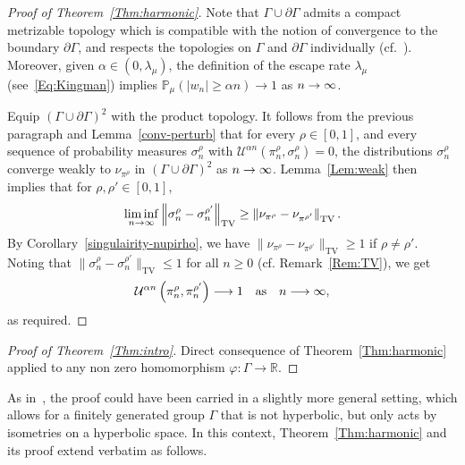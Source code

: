 \documentclass[10pt]{amsart}
\theoremstyle{definition}\newtheorem{defi}[theo]{Definition}\newtheorem{rema}[theo]{Remark}\newtheorem{exam}[theo]{Example}\newtheorem{exem}[theo]{Example}\newtheorem{nota}[theo]{Notation}
\DeclareMathOperator{\TV}{TV}
\newcommand{\cU}{\mathcal{U}}
\newcommand{\R}{\mathbb{R}}
\renewcommand{\Pr}{\mathbb{P}}
\renewcommand{\(}{\left(}
\renewcommand{\)}{\right)}
\renewcommand*{\to}{\mathchoice{\longrightarrow}{\rightarrow}{\rightarrow}{\rightarrow}}
\begin{document}
\begin{proof}[Proof of Theorem~\ref{Thm:harmonic}]
Note that $\Gamma \cup \partial \Gamma$ admits a compact metrizable topology which is compatible with the notion of convergence to the boundary $\partial \Gamma$, and respects the topologies on $\Gamma$ and $\partial \Gamma$ individually (cf.~\cite[7.2.M]{GromovHyperbolic}). Moreover, given $\alpha\in (0, \lambda_{\mu})$, the definition of the escape rate $\lambda_{\mu}$ (see~\eqref{Eq:Kingman}) implies $\Pr_{\mu}(|w_{n}|\geq \alpha n)\rightarrow 1$ as $n \to \infty$.


Equip $(\Gamma \cup \partial \Gamma)^2$ with the product topology. It follows from the previous paragraph and Lemma~\ref{conv-perturb} that for every $\rho \in [0, 1]$, and every sequence of probability measures $\sigma^\rho_{n}$ with $\cU^{\alpha n}(\pi^\rho_n, \sigma^\rho_{n})=0$, the distributions $\sigma^\rho_{n}$ converge weakly to $\nu_{\pi^\rho}$ in $(\Gamma \cup \partial \Gamma)^2$ as $n \to \infty$. Lemma~\ref{Lem:weak} then implies that for $\rho, \rho' \in [0, 1]$,
\[
\liminf_{n \to \infty}\left\|\sigma^\rho_{n}- \sigma^{\rho'}_{n}\right\|_{\TV} \ge \left\|\nu_{\pi^\rho}-\nu_{\pi^{\rho'}}\right\|_{\TV}.
\]
By Corollary~\ref{singulairity-nupirho}, we have $\|\nu_{\pi^\rho}-\nu_{\pi^{\rho'}}\|_{\TV}\ge 1$ if $\rho\neq \rho'$. Noting that $\|\sigma^\rho_{n}-\sigma^{\rho'}_{n}\|_{\TV} \le 1$ for all $n \geq 0$ (cf. Remark~\ref{Rem:TV}), we get
\[
\cU^{\alpha n}\left(\pi^\rho_{n}, \pi^{\rho'}_{n}\right)\to 1 \quad \text{as} \quad n \to \infty,
\]
as required.
\end{proof}



\begin{proof}[{Proof of Theorem~\ref{Thm:intro}}]
Direct consequence of Theorem~\ref{Thm:harmonic} applied to any non zero homomorphism $\varphi : \Gamma \rightarrow \R$.
\end{proof}




As in~\cite{BenardWinding}, the proof could have been carried in a slightly more general setting, which allows for a finitely generated group $\Gamma$ that is not hyperbolic, but only acts by isometries on a hyperbolic space. In this context, Theorem~\ref{Thm:harmonic} and its proof extend verbatim as follows.
\end{document}
